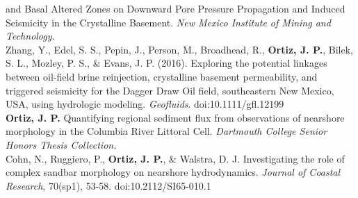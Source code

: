 \documentclass[11pt, letterpaper]{article}
\newcommand{\amper}{{\fontspec[Scale=.95]{Adobe Caslon Pro}\selectfont\itshape\&}}
\newcommand{\years}[1]{\marginnote{\scriptsize #1}}
\begin{document}
and Basal Altered Zones on Downward Pore Pressure Propagation and Induced
Seismicity in the Crystalline Basement. \emph{New Mexico Institute of Mining
and Technology.}\\ 
\years{2016}Zhang, Y., Edel, S. S., Pepin, J., Person, M.,
Broadhead, R., \textbf{Ortiz, J. P.}, Bilek, S. L., Mozley, P. S., \& Evans, J.
P. (2016). Exploring the potential linkages between oil-field brine
reinjection, crystalline basement permeability, and triggered seismicity for
the Dagger Draw Oil field, southeastern New Mexico, USA, using hydrologic
modeling. \emph{Geofluids}. doi:10.1111/gfl.12199\\
\years{2014}\textbf{Ortiz, J. P.} Quantifying regional sediment flux from
observations of nearshore morphology in the Columbia River Littoral Cell.
\emph{Dartmouth College Senior Honors Thesis Collection.}\\ 
\years{2014}Cohn, N., Ruggiero, P., \textbf{Ortiz, J. P.}, \& Walstra, D. J.
Investigating the role of complex sandbar morphology on nearshore
hydrodynamics. \emph{Journal of Coastal Research}, 70(sp1), 53-58.
doi:10.2112/SI65-010.1

\end{document}
